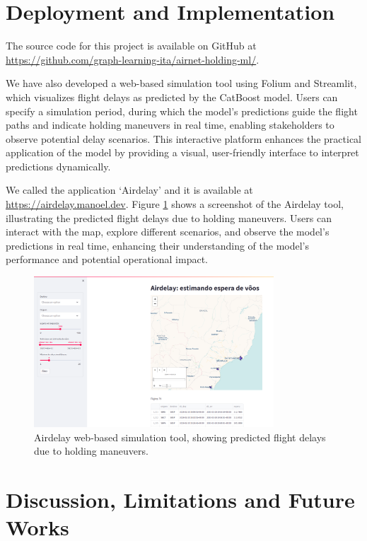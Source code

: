\section{Deployment and Implementation}

The source code for this project is available on GitHub at \href{https://github.com/graph-learning-ita/airnet-holding-ml/}{https://github.com/graph-learning-ita/airnet-holding-ml/}.

We have also developed a web-based simulation tool using Folium and Streamlit, which visualizes flight delays as predicted by the CatBoost model. Users can specify a simulation period, during which the model's predictions guide the flight paths and indicate holding maneuvers in real time, enabling stakeholders to observe potential delay scenarios. This interactive platform enhances the practical application of the model by providing a visual, user-friendly interface to interpret predictions dynamically.

We called the application `Airdelay' and it is available at \url{https://airdelay.manoel.dev}. Figure \ref{fig:airdelay} shows a screenshot of the Airdelay tool, illustrating the predicted flight delays due to holding maneuvers. Users can interact with the map, explore different scenarios, and observe the model's predictions in real time, enhancing their understanding of the model's performance and potential operational impact.

\begin{figure}
    \centering
    \includegraphics[width=0.8\textwidth]{img/airdelay.png}
    \caption{Airdelay web-based simulation tool, showing predicted flight delays due to holding maneuvers.}
    \label{fig:airdelay}
\end{figure}

\section{Discussion, Limitations and Future Works}

